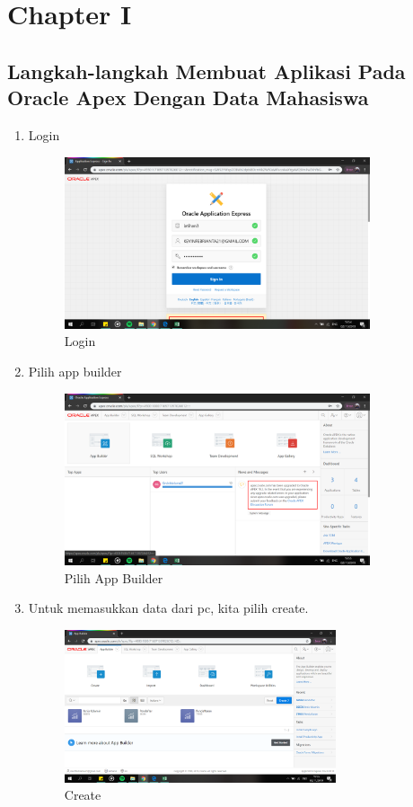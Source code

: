 \chapter{Chapter I}
\section{Langkah-langkah Membuat Aplikasi Pada Oracle Apex Dengan Data Mahasiswa}

\begin{enumerate}
\item Login
    \begin{figure}[!htbp]
    \centering
    \includegraphics[width=9cm]{picture/01.png}
    \caption{Login}
    \end{figure}
    
\item Pilih app builder
    \begin{figure}[!htbp]
    \centering
    \includegraphics[width=9cm]{picture/02.png}
    \caption{Pilih App Builder}
    \end{figure}
    
\newpage
\item Untuk memasukkan data dari pc, kita pilih create.
    \begin{figure}[!htbp]
    \centering
    \includegraphics[width=8cm]{picture/03.png}
    \caption{Create}
    \end{figure}
    

\end{enumerate}
